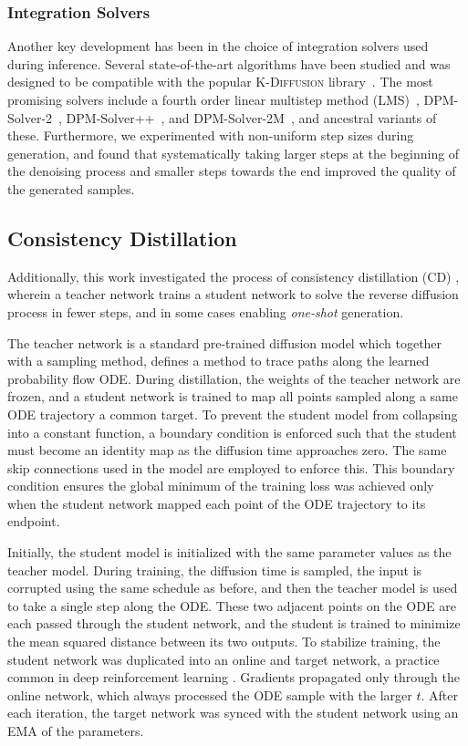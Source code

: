\subsubsection{Integration Solvers}

Another key development has been in the choice of integration solvers used during inference.
Several state-of-the-art algorithms have been studied and \pcdroid was designed to be compatible with the popular \textsc{K-Diffusion} library~\cite{KDiffusion}.
The most promising solvers include a fourth order linear multistep method (LMS)~\cite{ODEBook}, DPM-Solver-2~\cite{DPMSolverFastODE}, DPM-Solver++~\cite{DPMSolverFastSolver}, and DPM-Solver-2M~\cite{DPMSolverFastSolver}, and ancestral variants of these.
Furthermore, we experimented with non-uniform step sizes during generation, and found that systematically taking larger steps at the beginning of the denoising process and smaller steps towards the end improved the quality of the generated samples.

\subsection{Consistency Distillation}

Additionally, this work investigated the process of consistency distillation (CD) \cite{ConsistencyModels}, wherein a teacher network trains a student network to solve the reverse diffusion process in fewer steps, and in some cases enabling \textit{one-shot} generation.

The teacher network is a standard pre-trained diffusion model which together with a sampling method, defines a method to trace paths along the learned probability flow ODE.
During distillation, the weights of the teacher network are frozen, and a student network is trained to map all points sampled along a same ODE trajectory a common target.
To prevent the student model from collapsing into a constant function, a boundary condition is enforced such that the student must become an identity map as the diffusion time approaches zero.
The same skip connections used in the \pcdroid model are employed to enforce this.
This boundary condition ensures the global minimum of the training loss was achieved only when the student network mapped each point of the ODE trajectory to its endpoint.

Initially, the student model is initialized with the same parameter values as the teacher model.
During training, the diffusion time is sampled, the input is corrupted using the same schedule as before, and then the teacher model is used to take a single step along the ODE.
These two adjacent points on the ODE are each passed through the student network, and the student is trained to minimize the mean squared distance between its two outputs.
To stabilize training, the student network was duplicated into an online and target network, a practice common in deep reinforcement learning \cite{PlayingAtariDeep, ContinuousControlDeep, ImplicitQuantileNetworks}.
Gradients propagated only through the online network, which always processed the ODE sample with the larger $t$.
After each iteration, the target network was synced with the student network using an EMA of the parameters.

